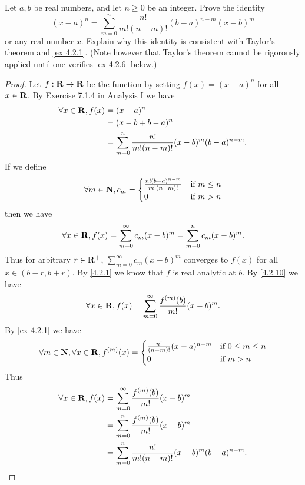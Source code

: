 \begin{exercise}\label{ex 4.2.5}
  Let \(a, b\) be real numbers, and let \(n \geq 0\) be an integer.
  Prove the identity
  \[
    (x - a)^n = \sum_{m = 0}^n \frac{n!}{m! (n - m)!} (b - a)^{n - m} (x - b)^m
  \]
  or any real number \(x\).
  Explain why this identity is consistent with Taylor's theorem and \cref{ex 4.2.1}.
  (Note however that Taylor's theorem cannot be rigorously applied until one verifies \cref{ex 4.2.6} below.)
\end{exercise}

\begin{proof}
  Let \(f : \mathbf{R} \to \mathbf{R}\) be the function by setting \(f(x) = (x - a)^n\) for all \(x \in \mathbf{R}\).
  By Exercise 7.1.4 in Analysis I we have
  \begin{align*}
    \forall x \in \mathbf{R}, f(x) & = (x - a)^n                                                        \\
                           & = (x - b + b - a)^n                                                \\
                           & = \sum_{m = 0}^n \frac{n!}{m! (n - m)!} (x - b)^m (b - a)^{n - m}.
  \end{align*}
  If we define
  \[
    \forall m \in \mathbf{N}, c_m = \begin{cases}
      \frac{n! (b - a)^{n - m}}{m! (n - m)!} & \text{if } m \leq n \\
      0                                      & \text{if } m > n
    \end{cases}
  \]
  then we have
  \[
    \forall x \in \mathbf{R}, f(x) = \sum_{m = 0}^\infty c_m (x - b)^m = \sum_{m = 0}^n c_m (x - b)^m.
  \]
  Thus for arbitrary \(r \in \mathbf{R}^+\), \(\sum_{m = 0}^\infty c_m (x - b)^m\) converges to \(f(x)\) for all \(x \in (b - r, b + r)\).
  By \cref{4.2.1} we know that \(f\) is real analytic at \(b\).
  By \cref{4.2.10} we have
  \begin{align*}
    \forall x \in \mathbf{R}, f(x) = \sum_{m = 0}^\infty \frac{f^{(m)}(b)}{m!} (x - b)^m.
  \end{align*}
  By \cref{ex 4.2.1} we have
  \[
    \forall m \in \mathbf{N}, \forall x \in \mathbf{R}, f^{(m)}(x) = \begin{cases}
      \frac{n!}{(n - m)!} (x - a)^{n - m} & \text{if } 0 \leq m \leq n \\
      0                                   & \text{if } m > n
    \end{cases}
  \]
  Thus
  \begin{align*}
    \forall x \in \mathbf{R}, f(x) & = \sum_{m = 0}^\infty \frac{f^{(m)}(b)}{m!} (x - b)^m              \\
                           & = \sum_{m = 0}^n \frac{f^{(m)}(b)}{m!} (x - b)^m                   \\
                           & = \sum_{m = 0}^n \frac{n!}{m! (n - m)!} (x - b)^m (b - a)^{n - m}.
  \end{align*}
\end{proof}

